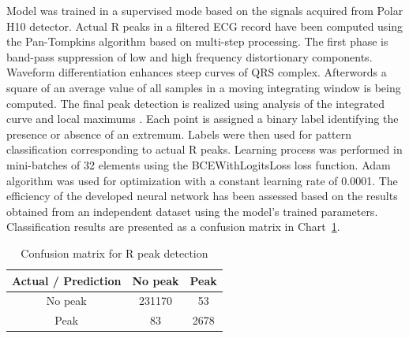 \documentclass[journal]{IEEEtran}
\begin{document}
Model was trained in a supervised mode based on the signals acquired from Polar H10 detector. Actual R peaks in a filtered ECG record have been computed using the Pan-Tompkins algorithm based on multi-step processing. The first phase is band-pass suppression of low and high frequency distortionary components. Waveform differentiation enhances steep curves of QRS complex. Afterwords a square of an average value of all samples in a moving integrating window is being computed. The final peak detection is realized using analysis of the integrated curve and local maximums \cite{27}.
Each point is assigned a binary label identifying the presence or absence of an extremum. Labels were then used for pattern classification corresponding to actual R peaks.
\newpage
Learning process was performed in mini-batches of 32 elements using the BCEWithLogitsLoss loss function. Adam algorithm was used for optimization with a constant learning rate of 0.0001. The efficiency of the developed neural network has been assessed based on the results obtained from an independent dataset using the model's trained parameters. Classification results are presented as a confusion matrix in Chart~\ref{tab:conf_matrix}.


\begin{table}[ht]
\centering
\caption{Confusion matrix for R peak detection}
\label{tab:conf_matrix}
\begin{tabular}{|c|c|c|}
\hline
\textbf{Actual / Prediction} & \textbf{No peak } & \textbf{Peak } \\
\hline
No peak  & 231170 & 53 \\
Peak  & 83 & 2678 \\
\hline
\end{tabular}
\end{table}
\end{document}
